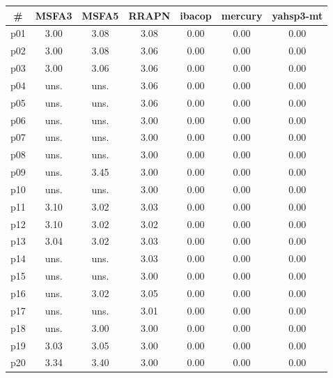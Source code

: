 \begin{tabular}{ccccccc}
\toprule
\textbf{\#} & \textbf{MSFA3} & \textbf{MSFA5} & \textbf{RRAPN} & \textbf{ibacop} & \textbf{mercury} & \textbf{yahsp3-mt}\\
\midrule
p01 & 3.00 & 3.08 & 3.08 & 0.00 & 0.00 & 0.00\\
p02 & 3.00 & 3.08 & 3.06 & 0.00 & 0.00 & 0.00\\
p03 & 3.00 & 3.06 & 3.06 & 0.00 & 0.00 & 0.00\\
p04 & uns. & uns. & 3.06 & 0.00 & 0.00 & 0.00\\
p05 & uns. & uns. & 3.06 & 0.00 & 0.00 & 0.00\\
p06 & uns. & uns. & 3.00 & 0.00 & 0.00 & 0.00\\
p07 & uns. & uns. & 3.00 & 0.00 & 0.00 & 0.00\\
p08 & uns. & uns. & 3.00 & 0.00 & 0.00 & 0.00\\
p09 & uns. & 3.45 & 3.00 & 0.00 & 0.00 & 0.00\\
p10 & uns. & uns. & 3.00 & 0.00 & 0.00 & 0.00\\
p11 & 3.10 & 3.02 & 3.03 & 0.00 & 0.00 & 0.00\\
p12 & 3.10 & 3.02 & 3.02 & 0.00 & 0.00 & 0.00\\
p13 & 3.04 & 3.02 & 3.03 & 0.00 & 0.00 & 0.00\\
p14 & uns. & uns. & 3.03 & 0.00 & 0.00 & 0.00\\
p15 & uns. & uns. & 3.00 & 0.00 & 0.00 & 0.00\\
p16 & uns. & 3.02 & 3.05 & 0.00 & 0.00 & 0.00\\
p17 & uns. & uns. & 3.01 & 0.00 & 0.00 & 0.00\\
p18 & uns. & 3.00 & 3.00 & 0.00 & 0.00 & 0.00\\
p19 & 3.03 & 3.05 & 3.00 & 0.00 & 0.00 & 0.00\\
p20 & 3.34 & 3.40 & 3.00 & 0.00 & 0.00 & 0.00\\
\bottomrule
\end{tabular}

